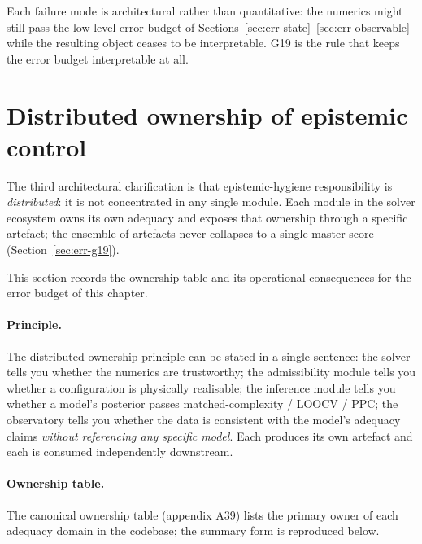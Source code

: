 Each failure mode is architectural rather than quantitative:
the numerics might still pass the low-level error budget of
Sections~\ref{sec:err-state}--\ref{sec:err-observable} while
the resulting object ceases to be interpretable.  G19 is the
rule that keeps the error budget interpretable at all.


\section{Distributed ownership of epistemic control}
\label{sec:err-epistemic}

The third architectural clarification is that
epistemic-hygiene responsibility is \emph{distributed}: it
is not concentrated in any single module.  Each module in
the solver ecosystem owns its own adequacy and exposes that
ownership through a specific artefact; the ensemble of
artefacts never collapses to a single master score
(Section~\ref{sec:err-g19}).

This section records the ownership table and its
operational consequences for the error budget of this
chapter.


\paragraph{Principle.}

The distributed-ownership principle can be stated in a
single sentence: the solver tells you whether the numerics
are trustworthy; the admissibility module tells you whether
a configuration is physically realisable; the inference
module tells you whether a model's posterior passes
matched-complexity / LOOCV / PPC; the observatory tells
you whether the data is consistent with the model's
adequacy claims \emph{without referencing any specific
model}.  Each produces its own artefact and each is
consumed independently downstream.


\paragraph{Ownership table.}

The canonical ownership table (appendix A39) lists the
primary owner of each adequacy domain in the codebase; the
summary form is reproduced below.

